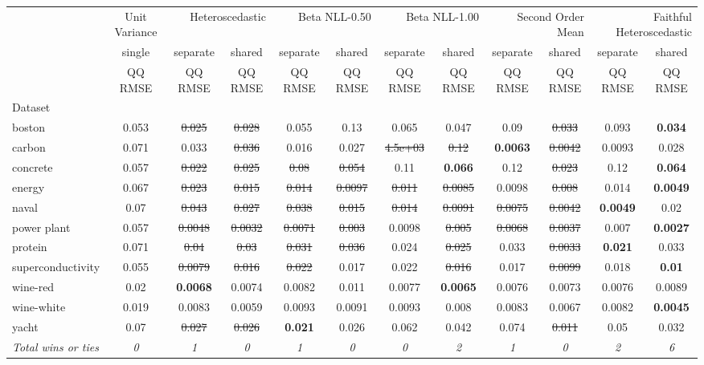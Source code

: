 \begin{tabular}{l|c|cc|cc|cc|cc|cc}
\toprule
{} & {Unit Variance} & \multicolumn{2}{r}{Heteroscedastic} & \multicolumn{2}{r}{Beta NLL-0.50} & \multicolumn{2}{r}{Beta NLL-1.00} & \multicolumn{2}{r}{Second Order Mean} & \multicolumn{2}{r}{Faithful Heteroscedastic} \\
{} & {single} & {separate} & {shared} & {separate} & {shared} & {separate} & {shared} & {separate} & {shared} & {separate} & {shared} \\
{} & {QQ RMSE} & {QQ RMSE} & {QQ RMSE} & {QQ RMSE} & {QQ RMSE} & {QQ RMSE} & {QQ RMSE} & {QQ RMSE} & {QQ RMSE} & {QQ RMSE} & {QQ RMSE} \\
{Dataset} & {} & {} & {} & {} & {} & {} & {} & {} & {} & {} & {} \\
\midrule
boston & 0.053 & \sout{0.025} & \sout{0.028} & 0.055 & 0.13 & 0.065 & 0.047 & 0.09 & \sout{0.033} & 0.093 & \textbf{0.034} \\
carbon & 0.071 & 0.033 & \sout{0.036} & 0.016 & 0.027 & \sout{4.5e+03} & \sout{0.12} & \textbf{0.0063} & \sout{0.0042} & 0.0093 & 0.028 \\
concrete & 0.057 & \sout{0.022} & \sout{0.025} & \sout{0.08} & \sout{0.054} & 0.11 & \textbf{0.066} & 0.12 & \sout{0.023} & 0.12 & \textbf{0.064} \\
energy & 0.067 & \sout{0.023} & \sout{0.015} & \sout{0.014} & \sout{0.0097} & \sout{0.011} & \sout{0.0085} & 0.0098 & \sout{0.008} & 0.014 & \textbf{0.0049} \\
naval & 0.07 & \sout{0.043} & \sout{0.027} & \sout{0.038} & \sout{0.015} & \sout{0.014} & \sout{0.0091} & \sout{0.0075} & \sout{0.0042} & \textbf{0.0049} & 0.02 \\
power plant & 0.057 & \sout{0.0048} & \sout{0.0032} & \sout{0.0071} & \sout{0.003} & 0.0098 & \sout{0.005} & \sout{0.0068} & \sout{0.0037} & 0.007 & \textbf{0.0027} \\
protein & 0.071 & \sout{0.04} & \sout{0.03} & \sout{0.031} & \sout{0.036} & 0.024 & \sout{0.025} & 0.033 & \sout{0.0033} & \textbf{0.021} & 0.033 \\
superconductivity & 0.055 & \sout{0.0079} & \sout{0.016} & \sout{0.022} & 0.017 & 0.022 & \sout{0.016} & 0.017 & \sout{0.0099} & 0.018 & \textbf{0.01} \\
wine-red & 0.02 & \textbf{0.0068} & 0.0074 & 0.0082 & 0.011 & 0.0077 & \textbf{0.0065} & 0.0076 & 0.0073 & 0.0076 & 0.0089 \\
wine-white & 0.019 & 0.0083 & 0.0059 & 0.0093 & 0.0091 & 0.0093 & 0.008 & 0.0083 & 0.0067 & 0.0082 & \textbf{0.0045} \\
yacht & 0.07 & \sout{0.027} & \sout{0.026} & \textbf{0.021} & 0.026 & 0.062 & 0.042 & 0.074 & \sout{0.011} & 0.05 & 0.032 \\
\textit{{Total wins or ties}} & \textit{0} & \textit{1} & \textit{0} & \textit{1} & \textit{0} & \textit{0} & \textit{2} & \textit{1} & \textit{0} & \textit{2} & \textit{6} \\
\bottomrule
\end{tabular}
